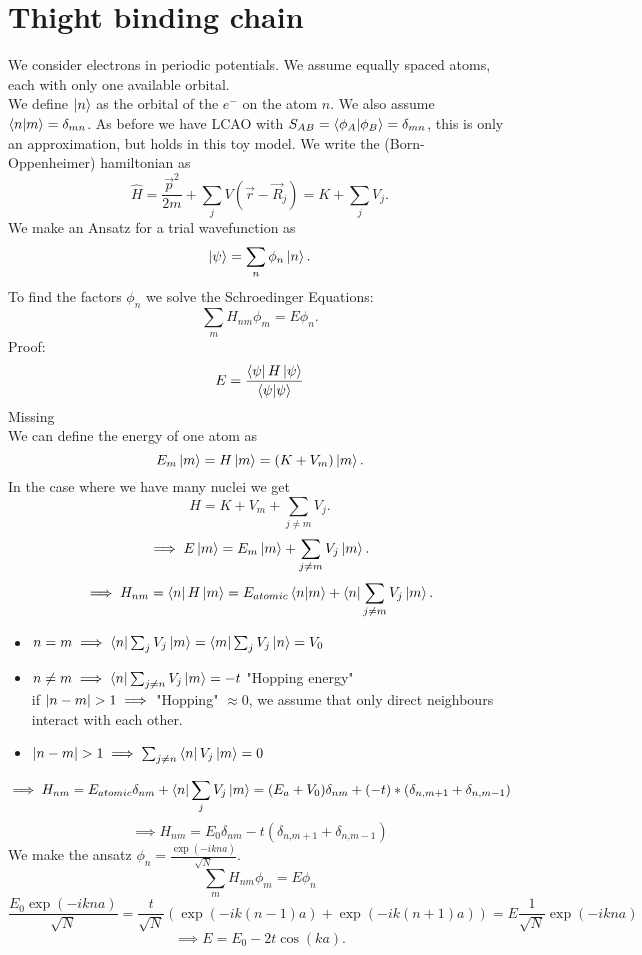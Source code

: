 \documentclass{report}
\begin{document}
\chapter{Thight binding chain}
We consider electrons in periodic potentials. We assume equally spaced atoms, each with only one available orbital.\\
We define $\ket{n} $ as the orbital of the $e^-$ on the atom $n$. We also assume $\bra{n} \ket{m} = \delta_{mn}$. As before we have LCAO with $S_{AB} = \bra{\phi_A} \ket{\phi_B} = \delta_{mn} $, this is only an approximation, but holds in this toy model. We write the (Born-Oppenheimer) hamiltonian as \[
	\hat{H} = \frac{\vec{p}^2}{2m} + \sum_{j} V \left( \vec{r}- \vec{R}_j \right) = K + \sum_{j} V_j
.\] We make an Ansatz for a trial wavefunction as \[
\ket{\psi} = \sum_{n} \phi_n \ket{n} 
.\] To find the factors $\phi_n$ we solve the Schroedinger Equations: \[
\sum_{m} H_{nm} \phi_m = E \phi_n
.\] Proof: \[
E = \frac{\bra{\psi } H \ket{\psi } }{\bra{\psi } \ket{\psi } }
\] Missing\\
We can define the energy of one atom as \[
	E_m \ket{m} = H \ket{m} = \left( K + V_m \right) \ket{m} 
.\] 
In the case where we have many nuclei we get \[
H = K + V_m + \sum_{j \neq m} V_j	
.\]\[
\implies E \ket{m}  = E_m \ket{m} + \sum_{j \neq m} V_j \ket{m} 
.\] \[
\implies H_{nm} = \bra{n} H \ket{m} = E_{atomic} \bra{n} \ket{m} + \bra{n} \sum_{j \neq m} V_j \ket{m} 
.\] 
\begin{itemize}
	\item $n = m \implies \bra{n} \sum_{j} V_j \ket{m} = \bra{m} \sum_{j} V_j \ket{n} = V_0$
	\item $n \neq m \implies \bra{n} \sum_{j \neq n} V_j \ket{m} = -t$ "Hopping energy"\\
		if $\abs{n - m} > 1 \implies $ "Hopping" $\approx 0$, we assume that only direct neighbours interact with each other.
	\item $\abs{n-m} > 1 \implies \sum_{j \neq n} \bra{n} V_j\ket{m} = 0 $
\end{itemize}
\[
	\implies H_{nm} = E_{atomic} \delta_{nm} + \bra{n} \sum_{j} V_j \ket{m} = (E_a + V_0) \delta_{nm} + (-t) * \left( \delta_{n\text{,}m+1} + \delta_{n\text{,}m-1} \right) 
\] \[
\implies H_{nm} = E_0 \delta_{nm} - t \left( \delta_{n\text{,}m+1} + \delta_{n\text{,}m-1} \right) 
\]  We make the ansatz $\phi_n = \frac{\exp(-ikna)}{\sqrt{N} }$. \[
\sum_{m} H_{nm} \phi_m = E \phi_n
\] \[
\frac{E_0 \exp(-ikna)}{\sqrt{N} }= \frac{t}{\sqrt{N} } \left( \exp(-ik(n-1)a) + \exp(-ik(n+1)a) \right) = E \frac{1}{\sqrt{N} } \exp(-ikna)
\] \[
\implies E = E_0 - 2t \cos{(ka)}
.\]   
\end{document}

